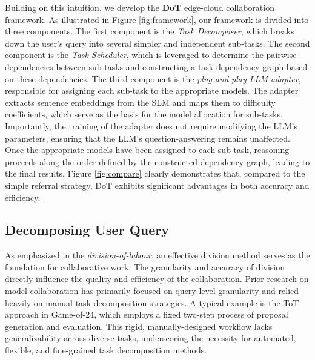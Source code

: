 Building on this intuition, we develop the \textbf{DoT} edge-cloud collaboration framework. As illustrated in Figure \ref{fig:framework}, our framework is divided into three components. The first component is the \textit{Task Decomposer}, which breaks down the user's query into several simpler and independent sub-tasks.
The second component is the \textit{Task Scheduler}, which is leveraged to determine the pairwise dependencies between sub-tasks and constructing a task dependency graph based on these dependencies.
The third component is the \textit{plug-and-play LLM adapter}, responsible for assigning each sub-task to the appropriate models.
The adapter extracts sentence embeddings from the SLM and maps them to difficulty coefficients, which serve as the basis for the model allocation for sub-tasks. Importantly, the training of the adapter does not require modifying the LLM's parameters, ensuring that the LLM's question-answering remains unaffected.
Once the appropriate models have been assigned to each sub-task, reasoning proceeds along the order defined by the constructed dependency graph, leading to the final results.
Figure \ref{fig:compare} clearly demonstrates that, compared to the simple referral strategy, DoT exhibits significant advantages in both accuracy and efficiency.


\subsection{Decomposing User Query}
As emphasized in the \textit{division-of-labour}, an effective division method serves as the foundation for collaborative work. The granularity and accuracy of division directly influence the quality and efficiency of the collaboration. 
Prior research on model collaboration has primarily focused on query-level granularity and relied heavily on manual task decomposition strategies. A typical example is the ToT approach in Game-of-24, which employs a fixed two-step process of proposal generation and evaluation. This rigid, manually-designed workflow lacks generalizability across diverse tasks, underscoring the necessity for automated, flexible, and fine-grained task decomposition methods.

